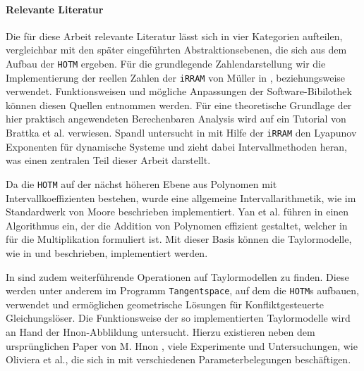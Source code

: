 \paragraph{Relevante Literatur}
Die für diese Arbeit relevante Literatur lässt sich in vier Kategorien aufteilen, vergleichbar mit den später eingeführten Abstraktionsebenen, die sich aus dem Aufbau der \verb+HOTM+ ergeben. Für die grundlegende Zahlendarstellung wir die Implementierung der reellen Zahlen der \verb+iRRAM+ von Müller in \cite{Mller2009EnhancingIE}, beziehungsweise \cite{mueller2001} verwendet. Funktionsweisen und mögliche Anpassungen der Software-Bibilothek können diesen Quellen entnommen werden. Für eine theoretische Grundlage der hier praktisch angewendeten Berechenbaren Analysis wird auf ein Tutorial von Brattka et al. \cite{Brattka2008} verwiesen. Spandl untersucht in \cite{DBLP:spandl} mit Hilfe der \verb+iRRAM+ den Lyapunov Exponenten für dynamische Systeme und zieht dabei Intervallmethoden heran, was einen zentralen Teil dieser Arbeit darstellt. 

Da die \verb+HOTM+ auf der nächst höheren Ebene aus Polynomen mit Intervallkoeffizienten bestehen, wurde eine allgemeine Intervallarithmetik, wie im Standardwerk von Moore \cite{moore1979} beschrieben implementiert. Yan et al. führen in \cite{geobuckets} einen Algorithmus ein, der die Addition von Polynomen effizient gestaltet, welcher in \cite{geobucketsmulti} für die Multiplikation formuliert ist. Mit dieser Basis können die Taylormodelle, wie in \cite{makino2001} und \cite{DBLP:conf/macis/BrausseKM15} beschrieben, implementiert werden.

In \cite{DBLP:conf/macis/BrausseKM15} sind zudem weiterführende Operationen auf Taylormodellen zu finden. Diese werden unter anderem im Programm \verb+Tangentspace+, auf dem die \verb+HOTM+s aufbauen, verwendet und ermöglichen geometrische Lösungen für Konfliktgesteuerte Gleichungslöser. Die Funktionsweise der so implementierten Taylormodelle wird an Hand der H\e non-Abblildung untersucht. Hierzu existieren neben dem ursprünglichen Paper von M. H\e non \cite{henon1976}, viele Experimente und Untersuchungen, wie Oliviera et al., die sich in \cite{MartinsdeOliveira2020} mit verschiedenen Parameterbelegungen beschäftigen.






